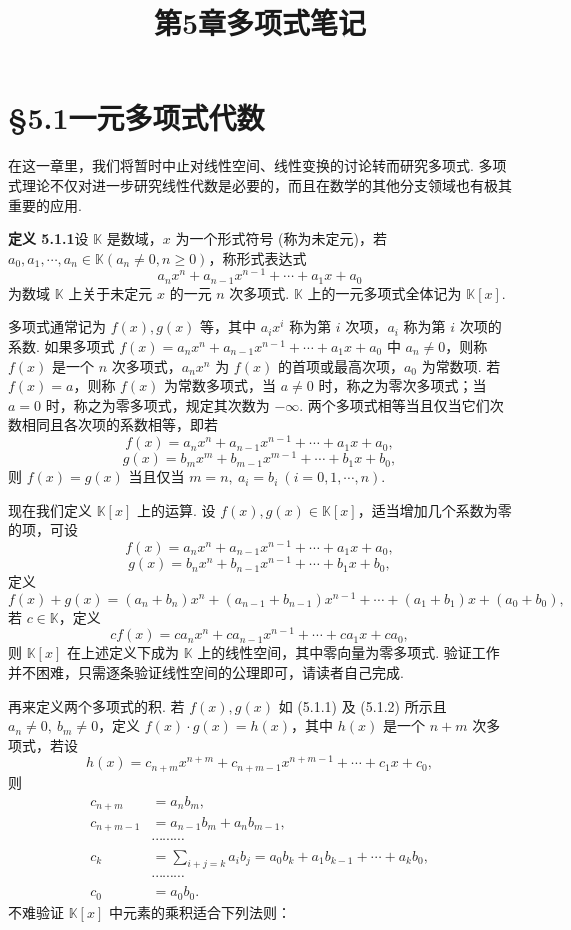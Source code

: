 \documentclass[UTF8,12pt,a4paper,fontset=fandol]{ctexart}
\title{第5章\quad 多项式笔记}
\author{}
\date{}
\begin{document}
\maketitle

\section*{§5.1\quad 一元多项式代数}

在这一章里，我们将暂时中止对线性空间、线性变换的讨论转而研究多项式. 多项式理论不仅对进一步研究线性代数是必要的，而且在数学的其他分支领域也有极其重要的应用.

\noindent\textbf{定义 5.1.1}\quad 设 $\mathbb{K}$ 是数域，$x$ 为一个形式符号 (称为未定元)，若 $a_0,a_1,\cdots,a_n\in\mathbb{K}(a_n\neq 0,n\geq 0)$，称形式表达式
\[
a_nx^n+a_{n-1}x^{n-1}+\cdots+a_1x+a_0
\]
为数域 $\mathbb{K}$ 上关于未定元 $x$ 的一元 $n$ 次多项式. $\mathbb{K}$ 上的一元多项式全体记为 $\mathbb{K}[x]$.

多项式通常记为 $f(x),g(x)$ 等，其中 $a_ix^i$ 称为第 $i$ 次项，$a_i$ 称为第 $i$ 次项的系数. 如果多项式 $f(x)=a_nx^n+a_{n-1}x^{n-1}+\cdots+a_1x+a_0$ 中 $a_n\neq 0$，则称 $f(x)$ 是一个 $n$ 次多项式，$a_nx^n$ 为 $f(x)$ 的首项或最高次项，$a_0$ 为常数项. 若 $f(x)=a$，则称 $f(x)$ 为常数多项式，当 $a\neq 0$ 时，称之为零次多项式；当 $a=0$ 时，称之为零多项式，规定其次数为 $-\infty$. 两个多项式相等当且仅当它们次数相同且各次项的系数相等，即若
\begin{equation}
f(x)=a_nx^n+a_{n-1}x^{n-1}+\cdots+a_1x+a_0,
\tag{5.1.1}
\end{equation}
\begin{equation}
g(x)=b_mx^m+b_{m-1}x^{m-1}+\cdots+b_1x+b_0,
\tag{5.1.2}
\end{equation}
则 $f(x)=g(x)$ 当且仅当 $m=n,\ a_i=b_i\ (i=0,1,\cdots,n)$.

现在我们定义 $\mathbb{K}[x]$ 上的运算. 设 $f(x),g(x)\in\mathbb{K}[x]$，适当增加几个系数为零的项，可设
\[
f(x)=a_nx^n+a_{n-1}x^{n-1}+\cdots+a_1x+a_0,
\]
\[
g(x)=b_nx^n+b_{n-1}x^{n-1}+\cdots+b_1x+b_0,
\]
定义
\[
f(x)+g(x)=(a_n+b_n)x^n+(a_{n-1}+b_{n-1})x^{n-1}+\cdots+(a_1+b_1)x+(a_0+b_0),
\]
若 $c\in\mathbb{K}$，定义
\[
cf(x)=ca_nx^n+ca_{n-1}x^{n-1}+\cdots+ca_1x+ca_0,
\]
则 $\mathbb{K}[x]$ 在上述定义下成为 $\mathbb{K}$ 上的线性空间，其中零向量为零多项式. 验证工作并不困难，只需逐条验证线性空间的公理即可，请读者自己完成.

再来定义两个多项式的积. 若 $f(x),g(x)$ 如 (5.1.1) 及 (5.1.2) 所示且 $a_n\neq 0,\ b_m\neq 0$，定义 $f(x)\cdot g(x)=h(x)$，其中 $h(x)$ 是一个 $n+m$ 次多项式，若设
\[
h(x)=c_{n+m}x^{n+m}+c_{n+m-1}x^{n+m-1}+\cdots+c_1x+c_0,
\]
则
\[
\begin{aligned}
c_{n+m}&=a_nb_m,\\
c_{n+m-1}&=a_{n-1}b_m+a_nb_{m-1},\\
&\cdots\cdots\cdots\\
c_k&=\sum_{i+j=k}a_ib_j=a_0b_k+a_1b_{k-1}+\cdots+a_kb_0,\\
&\cdots\cdots\cdots\\
c_0&=a_0b_0.
\end{aligned}
\]
不难验证 $\mathbb{K}[x]$ 中元素的乘积适合下列法则：
\end{document}
